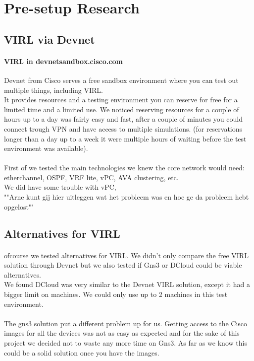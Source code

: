\documentclass[english]{article}
\begin{document}
	\section{Pre-setup Research}
	\subsection{VIRL via Devnet}
	\paragraph{VIRL in devnetsandbox.cisco.com }
	Devnet from Cisco serves a free sandbox environment where you can test out multiple things, including VIRL.\\ 
	It provides resources and a testing environment you can reserve for free for a limited time and a limited use. We noticed reserving resources for a couple of hours up to a day was fairly easy and fast, after a couple of minutes you could connect trough VPN and have access to multiple simulations. (for reservations longer than a day up to a week it were multiple hours of waiting before the test environment was available).\\
	\\
	First of we tested the main technologies we knew the core network would need: etherchannel, OSPF, VRF lite, vPC, AVA clustering, etc.\\
	We did have some trouble with vPC,\\ ""Arne kunt gij hier uitleggen wat het probleem was en hoe ge da probleem hebt opgelost""\\
	
	
	\subsection{Alternatives for VIRL}
	\paragraph{} ofcourse we tested alternatives for VIRL. We didn't only compare the free VIRL solution through Devnet but we also tested if Gns3 or DCloud could be viable alternatives.\\
	We found DCloud was very similar to the Devnet VIRL solution, except it had a bigger limit on machines. We could only use up to 2 machines in this test environment.\\
	\\
	The gns3 solution put a different problem up for us. Getting access to the Cisco images for all the devices was not as easy as expected and for the sake of this project we decided not to waste any more time on Gns3. As far as we know this could be a solid solution once you have the images.\\
	
\end{document}
